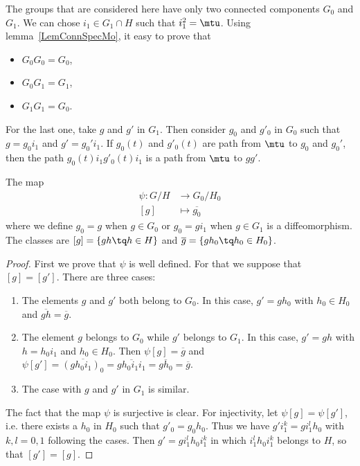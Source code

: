 The groups that are considered here have only two connected components $G_0$ and $G_1$. We can chose $i_1\in G_1\cap H$ such that $i_1^2=\mtu$. Using lemma~\ref{LemConnSpecMo}, it easy to prove that
\begin{itemize}
\item $G_0G_0=G_0$,
\item $G_0G_1=G_1$,
\item $G_1G_1=G_0$.
\end{itemize}
For the last one, take $g$ and $g'$ in $G_1$. Then consider $g_0$ and $g'_0$ in $G_0$ such that $g=g_0i_1$ and $g'=g_0'i_1$. If $g_0(t)$ and $g'_0(t)$ are path from $\mtu$ to $g_0$ and $g_0'$, then the path $g_0(t)i_1g'_0(t)i_1$ is a path from $\mtu$ to $gg'$.

\begin{proposition} \label{PropGHconn}
The map
\begin{equation}
\begin{aligned}
 \psi\colon G/H&\to G_0/H_0 \\
[g]&\mapsto \overline{ g_0 }
\end{aligned}
\end{equation}
where we define $g_0=g$ when $g\in G_0$ or $g_0=gi_1$ when $g\in G_1$ is a diffeomorphism. The classes are $[g]=\{ gh\tq h\in H \}$ and $\overline{ g }=\{ gh_0\tq h_0\in H_0 \}$.
\end{proposition}

\begin{proof}
First we prove that $\psi$ is well defined. For that we suppose that $[g]=[g']$. There are three cases:
\begin{enumerate}
\item The elements $g$ and $g'$ both belong to $G_0$. In this case, $g'=gh_0$ with $h_0\in H_0$ and $\overline{ gh }=\overline{ g }$.
\item The element $g$ belongs to $G_0$ while $g'$ belongs to $G_1$. In this case, $g'=gh$ with $h=h_0i_1$ and $h_0\in H_0$. Then $\psi[g]=\overline{ g }$ and $\psi[g']= \overline{ (gh_0i_1)_0 }=\overline{ gh_0i_1i_1 }=\overline{ gh_0 }=\overline{ g } $.
\item The case with $g$ and $g'$ in $G_1$ is similar.
\end{enumerate}

The fact that the map $\psi$ is surjective is clear. For injectivity, let $\psi[g]=\psi[g']$, i.e. there exists a $h_0$ in $H_0$ such that $g'_0=g_0h_0$. Thus we have $g'i_1^k=gi_1^lh_0$ with $k,l=0,1$ following the cases. Then $g'=gi_1^lh_0i_1^k$ in which $i_1^lh_0i_1^k$ belongs to $H$, so that $[g']=[g]$.

\end{proof}


